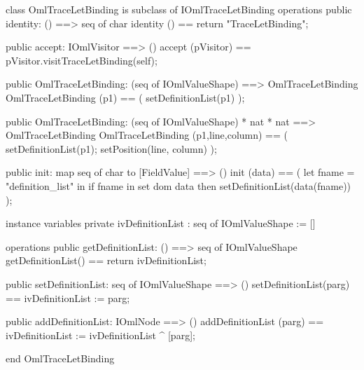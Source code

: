 \begin{vdm_al}
class OmlTraceLetBinding is subclass of IOmlTraceLetBinding
operations
  public identity: () ==> seq of char
  identity () == return "TraceLetBinding";

  public accept: IOmlVisitor ==> ()
  accept (pVisitor) == pVisitor.visitTraceLetBinding(self);

  public OmlTraceLetBinding:
    (seq of IOmlValueShape) ==> OmlTraceLetBinding
  OmlTraceLetBinding (p1) == 
    ( setDefinitionList(p1) );

  public OmlTraceLetBinding:
    (seq of IOmlValueShape) *
    nat *
    nat ==> OmlTraceLetBinding
  OmlTraceLetBinding (p1,line,column) == 
    ( setDefinitionList(p1);
      setPosition(line, column) );

  public init: map seq of char to [FieldValue] ==> ()
  init (data) ==
    ( let fname = "definition_list" in
        if fname in set dom data
        then setDefinitionList(data(fname)) );

instance variables
  private ivDefinitionList : seq of IOmlValueShape := []

operations
  public getDefinitionList: () ==> seq of IOmlValueShape
  getDefinitionList() == return ivDefinitionList;

  public setDefinitionList: seq of IOmlValueShape ==> ()
  setDefinitionList(parg) == ivDefinitionList := parg;

  public addDefinitionList: IOmlNode ==> ()
  addDefinitionList (parg) == ivDefinitionList := ivDefinitionList ^ [parg];

end OmlTraceLetBinding
\end{vdm_al}

